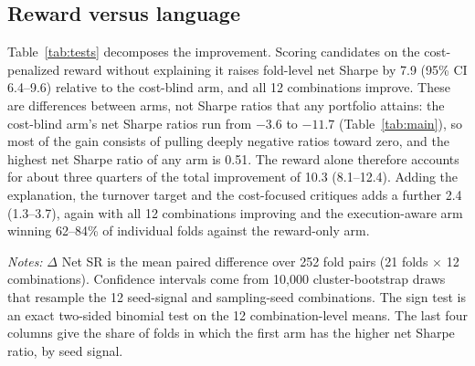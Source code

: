\documentclass[preprint,12pt,authoryear]{elsarticle}
\newcommand{\tablenote}[1]{\par\vspace{0.4em}\begin{minipage}{\linewidth}\footnotesize #1\end{minipage}}
\begin{document}
\subsection{Reward versus language}\label{sec:decomp}

Table~\ref{tab:tests} decomposes the improvement. Scoring candidates on the cost-penalized reward without explaining it raises fold-level net Sharpe by 7.9 (95\% CI 6.4--9.6) relative to the cost-blind arm, and all 12 combinations improve. These are differences between arms, not Sharpe ratios that any portfolio attains: the cost-blind arm's net Sharpe ratios run from $-3.6$ to $-11.7$ (Table~\ref{tab:main}), so most of the gain consists of pulling deeply negative ratios toward zero, and the highest net Sharpe ratio of any arm is 0.51. The reward alone therefore accounts for about three quarters of the total improvement of 10.3 (8.1--12.4). Adding the explanation, the turnover target and the cost-focused critiques adds a further 2.4 (1.3--3.7), again with all 12 combinations improving and the execution-aware arm winning 62--84\% of individual folds against the reward-only arm.

\begin{table}[t]
\centering
\caption{Paired differences in out-of-sample net Sharpe ratio between feedback conditions.}
\label{tab:tests}
\footnotesize
{}
\tablenote{\emph{Notes:} $\Delta$ Net SR is the mean paired difference over 252 fold pairs (21 folds $\times$ 12 combinations). Confidence intervals come from 10,000 cluster-bootstrap draws that resample the 12 seed-signal and sampling-seed combinations. The sign test is an exact two-sided binomial test on the 12 combination-level means. The last four columns give the share of folds in which the first arm has the higher net Sharpe ratio, by seed signal.}
\end{table}
\end{document}
